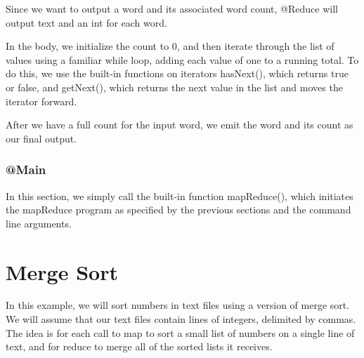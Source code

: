 \documentclass{article} \usepackage{fancyhdr, multicol}
\begin{document}
Since we want to output a word and its associated word count, @Reduce will output text and an int for each word.

In the body, we initialize the count to 0, and then iterate through the list of values using a familiar while loop, adding each value of one to a running total. To do this, we use the built-in functions on iterators hasNext(), which returns true or false, and getNext(), which returns the next value in the list and moves the iterator forward. 

After we have a full count for the input word, we emit the word and its count as our final output.

\subsubsection*{@Main}
In this section, we simply call the built-in function mapReduce(), which initiates the mapReduce program as specified by the previous sections and the command line arguments.


\section*{Merge Sort}
\label{merge_sort}
In this example, we will sort numbers in text files using a version of merge sort. We will assume that our text files contain lines of integers, delimited by commas. The idea is for each call to map to sort a small list of numbers on a single line of text, and for reduce to merge all of the sorted lists it receives.
\end{document}
